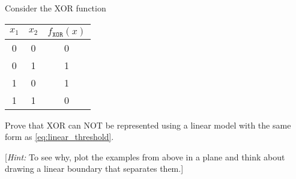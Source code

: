 Consider the XOR function
\begin{center}
\begin{tabular}{|c|c|c|} 
\hline
$x_1$ & $x_2$ & $f_{\texttt{XOR}}(x)$ \\ 
\hline
0 & 0 & 0 \\
0 & 1 & 1 \\
1 & 0 & 1 \\
1 & 1 & 0 \\
\hline
\end{tabular}
\end{center}

Prove that XOR can NOT be represented using a linear model with the same form as \eqref{eq:linear_threshold}.

[\textit{Hint:} To see why, plot the examples from above in a plane and think about drawing a linear boundary that separates them.]